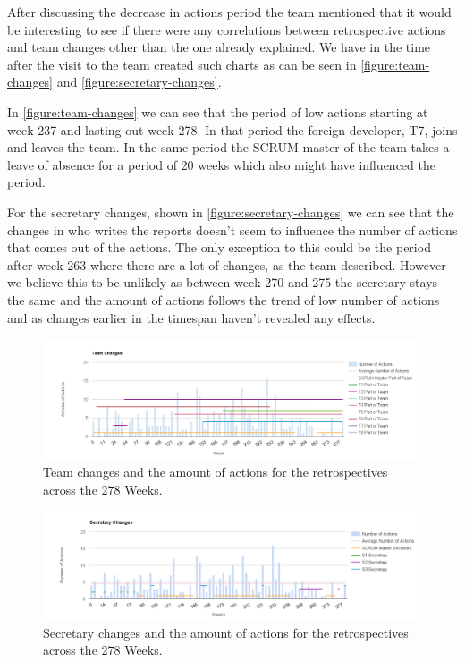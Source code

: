 After discussing the decrease in actions period the team mentioned that it would be interesting to see if there were any correlations between retrospective actions and team changes other than the one already explained. We have in the time after the visit to the team created such charts as can be seen in \autoref{figure:team-changes} and \autoref{figure:secretary-changes}. 

In \autoref{figure:team-changes} we can see that the period of low actions starting at week 237 and lasting out week 278. In that period the foreign developer, T7, joins and leaves the team. In the same period the SCRUM master of the team takes a leave of absence for a period of 20 weeks which also might have influenced the period. 

For the secretary changes, shown in \autoref{figure:secretary-changes} we can see that the changes in who writes the reports doesn't seem to influence the number of actions that comes out of the actions. The only exception to this could be the period after week 263 where there are a lot of changes, as the team described. However we believe this to be unlikely as between week 270 and 275 the secretary stays the same and the amount of actions follows the trend of low number of actions and as changes earlier in the timespan haven't revealed any effects. 

\begin{figure}
	\centering
	\includegraphics[width=\textwidth, keepaspectratio]{figures/team-changes.png}
	\caption{Team changes and the amount of actions for the retrospectives across the 278 Weeks.}
	\label{figure:team-changes}
\end{figure}

\begin{figure}
	\centering
	\includegraphics[width=\textwidth, keepaspectratio]{figures/secretary-changes.png}
	\caption{Secretary changes and the amount of actions for the retrospectives across the 278 Weeks.}
	\label{figure:secretary-changes}
\end{figure}
\afterpage{\clearpage}

